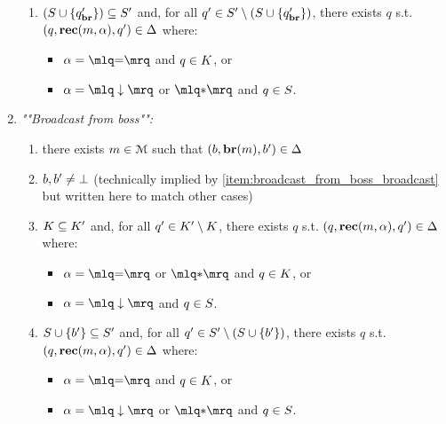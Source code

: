 \begin{definition}
\begin{enumerate}
\begin{enumerate}[label = (\arabic*)]
			\item\label{item:broadcast_from_clique_covset}$(S \cup \{q_{\textbf{br}}'\}) \subseteq S'$ and, for all $q' \in S' \setminus (S \cup \{q_{\textbf{br}}'\})$, there exists $q$ s.t. $(q, \textbf{rec}(m, \alpha), q') \in \Delta$ where:
			\begin{itemize}
				\item  $\anact = \quotemarks{\eqtestact}$ and $q \in \clique$, or
				\item $\anact = \quotemarks{\enregact}$ or $\quotemarks{\dummyact}$ and $q \in S$.
			\end{itemize}
		\end{enumerate}
		
		\item \emph{""Broadcast from boss"":}
		\begin{enumerate}[label = (\arabic*)]
			\item \label{item:broadcast_from_boss_broadcast} there exists $m \in \mathcal{M}$ such that $(\boss, \brone{m}, \boss') \in \transitions$
			
			\item\label{item:broadcast_from_boss_boss} $\boss, \boss' \ne \noboss$ (technically implied by \ref{item:broadcast_from_boss_broadcast} but written here to match other cases)
			
			\item\label{item:broadcast_from_boss_clique} 	$\clique \subseteq \clique'$ and, for all $q' \in \clique' \setminus \clique$, there exists $q$ s.t. $(q, \textbf{rec}(m, \alpha), q') \in \Delta$ where:
			\begin{itemize}
				\item $\anact = \quotemarks{\eqtestact}$ or $\quotemarks{\dummyact}$ and $q \in \clique$, or
				\item $\anact= \quotemarks{\enregact}$ and $q \in S$.
			\end{itemize}
			
			\item\label{item:broadcast_from_boss_covset} $\covset \cup \set{\boss'} \subseteq \covset'$ and, for all $q' \in \covset' \setminus (\covset \cup \set{\boss'})$, there exists $q$ s.t. $(q, \textbf{rec}(m, \alpha), q') \in \Delta$ where:
			\begin{itemize}
				\item  $\anact = \quotemarks{\eqtestact}$ and $q \in \clique$, or
				\item $\anact = \quotemarks{\enregact}$ or $\quotemarks{\dummyact}$ and $q \in S$.
			\end{itemize}
		\end{enumerate}
		

\end{enumerate}
\end{definition}
